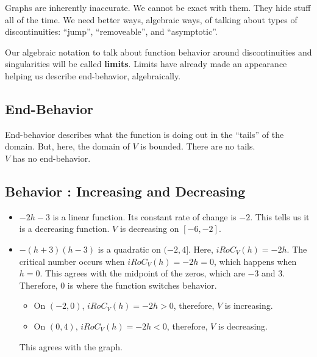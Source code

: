 \documentclass{ximera}
\begin{document}
\begin{notation}


Graphs are inherently inaccurate.  We cannot be exact with them.  They hide stuff all of the time. We need better ways, algebraic ways, of talking about types of discontinuities: ``jump'', ``removeable'', and ``asymptotic''.

Our algebraic notation to talk about function behavior around discontinuities and singularities will be called \textbf{\textcolor{purple!85!blue}{limits}}.  Limits have already made an appearance helping us describe end-behavior, algebraically.
\end{notation}










\subsection*{End-Behavior} 


End-behavior describes what the function is doing out in the ``tails'' of the domain.  But, here, the domain of $V$ is bounded.  There are no tails. \\

$V$ has no end-behavior. \\









\subsection*{Behavior : Increasing and Decreasing} 



\begin{itemize}
\item \textbf{$-2h-3$} is a linear function.  Its constant rate of change is $-2$.  This tells us it is a decreasing function.  $V$ is decreasing on $[-6, -2]$.

\item \textbf{$-(h+3)(h-3)$} is a quadratic on $(-2, 4]$. Here, $iRoC_V(h) = -2h$. The critical number occurs when $iRoC_V(h) = -2h = 0$, which happens when $h=0$. This agrees with the midpoint of the zeros, which are $-3$ and $3$.  Therefore, $0$ is where the function switches behavior.  

\begin{itemize}
\item On $(-2, 0)$, $iRoC_V(h) = -2h > 0$, therefore, $V$ is increasing.  
\item On $(0,4)$, $iRoC_V(h) = -2h < 0$, therefore, $V$ is decreasing.
\end{itemize}

This agrees with the graph.

\end{itemize}
\end{document}
